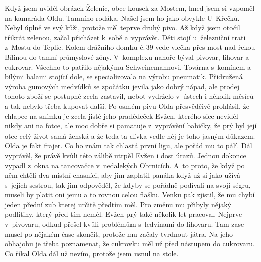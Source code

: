 
Když jsem uviděl obrázek Želenic, obce kousek za Mostem, hned jsem si
vzpoměl na kamaráda Oldu. Tamního rodáka. Našel jsem ho jako obvykle
U~Křečků. Nebyl úplně ve svý kůži, protože měl teprve druhý pivo. Až
když jsem otočil třikrát zelenou, začal přicházet k~sobě a vyprávět.
Děti stojí u~železniční trati z~Mostu do Teplic. Kolem drážního domku
č.\,39 vede vlečka přes most nad řekou Bílinou do tamní průmyslové zóny.
V~komplexu nahoře býval pivovar, lihovar a cukrovar. Všechno to
patřilo nějakýmu Schweinemannovi. Továrna s~komínem a bílými halami
stojící dole, se specializovala na výrobu pneumatik. Přidružená výroba
gumových medvídků se zpočátku jevila jako dobrý nápad, ale prodej
tohoto zboží se postupně zcela zastavil, neboť vydrželo v~ústech i
několik měsíců a tak nebylo třeba kupovat další. Po osmém pivu Olda
přesvědčivě prohlásil, že chlapec na snímku je zcela jistě jeho
pradědeček Evžen, kterého sice neviděl nikdy ani na fotce, ale moc
dobře si pamatuje z~vyprávění babičky, že prý byl její otec celý život
samá ženská a že teda ta dívka vedle něj je toho jasným důkazem. Olda
je fakt frajer. Co ho znám tak chlastá první ligu, ale pořád mu to
pálí. Dál vyprávěl, že právě kvůli této zálibě utrpěl Evžen i dost
úrazů. Jednou dokonce vypadl z~okna na tancovačce v~nedalekých
Obrnicích. A~to proto, že když po něm chtěli dva místní chasníci, aby
jim zaplatil panáka když už si jako užívá s~jejich sestrou, tak jim
odpověděl, že kdyby se pořádně podívali na svojí ségru, museli by
platit oni jemu a to rovnou celou flašku. Venku pak zjistil, že mu
chybí jeden přední zub kterej určitě předtím měl. Pro změnu mu přibyly
nějaký podlitiny, který před tím neměl. Evžen prý také několik let
pracoval. Nejprve v~pivovaru, odkud přešel kvůli problémům s~ledvinami
do lihovaru. Tam zase musel po nějakém čase skončit, protože mu začaly
    tvrdnout játra. Na jeho obhajobu je třeba poznamenat, že cukrovku
    měl už před nástupem do cukrovaru. Co říkal Olda dál už nevím,
    protože jsem usnul na stole.


